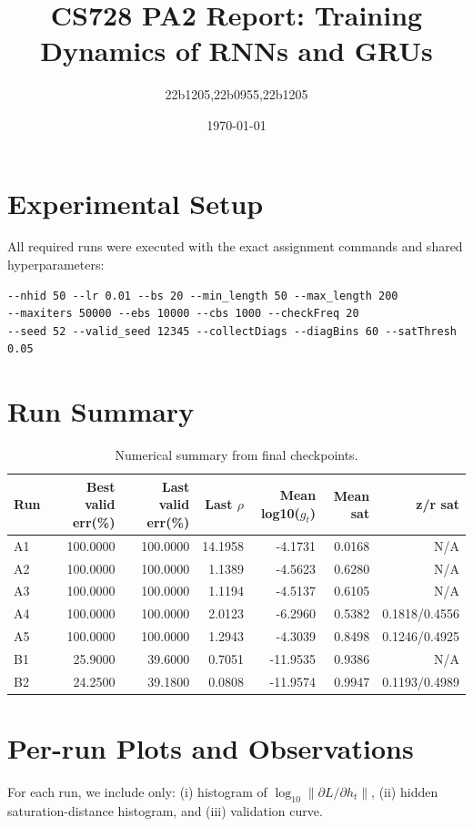 \documentclass[11pt]{article}
\title{CS728 PA2 Report: Training Dynamics of RNNs and GRUs}
\author{22b1205,22b0955,22b1205}
\date{\today}
\begin{document}
\maketitle

\section{Experimental Setup}
All required runs were executed with the exact assignment commands and shared hyperparameters:
\begin{verbatim}
--nhid 50 --lr 0.01 --bs 20 --min_length 50 --max_length 200
--maxiters 50000 --ebs 10000 --cbs 1000 --checkFreq 20
--seed 52 --valid_seed 12345 --collectDiags --diagBins 60 --satThresh 0.05
\end{verbatim}

\section{Run Summary}
\begin{table}[H]
\centering
\begin{tabular}{lrrrrrr}
\toprule
Run & Best valid err(\%) & Last valid err(\%) & Last $\rho$ & Mean log10($g_t$) & Mean sat & z/r sat \\
\midrule
A1 & 100.0000 & 100.0000 & 14.1958 & -4.1731 & 0.0168 & N/A \\
A2 & 100.0000 & 100.0000 & 1.1389 & -4.5623 & 0.6280 & N/A \\
A3 & 100.0000 & 100.0000 & 1.1194 & -4.5137 & 0.6105 & N/A \\
A4 & 100.0000 & 100.0000 & 2.0123 & -6.2960 & 0.5382 & 0.1818/0.4556 \\
A5 & 100.0000 & 100.0000 & 1.2943 & -4.3039 & 0.8498 & 0.1246/0.4925 \\
B1 & 25.9000 & 39.6000 & 0.7051 & -11.9535 & 0.9386 & N/A \\
B2 & 24.2500 & 39.1800 & 0.0808 & -11.9574 & 0.9947 & 0.1193/0.4989 \\
\bottomrule
\end{tabular}
\caption{Numerical summary from final checkpoints.}
\end{table}

\section{Per-run Plots and Observations}
For each run, we include only: (i) histogram of $\log_{10}\|\partial L/\partial h_t\|$, (ii) hidden saturation-distance histogram, and (iii) validation curve.
\end{document}
